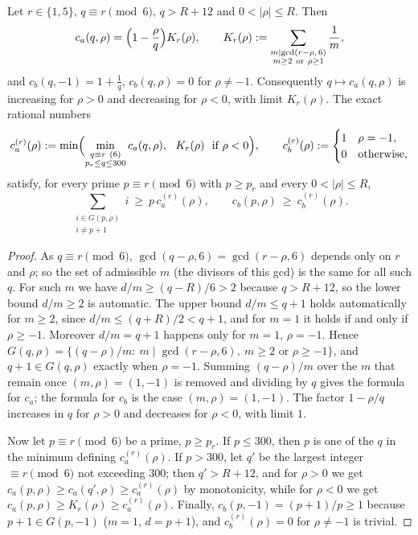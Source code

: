 \begin{lemma}\label{lem:class-weights}
Let $r\in\{1,5\}$, $q\equiv r\pmod 6$, $q>R+12$ and $0<|\rho|\le R$. Then
\[
c_a(q,\rho)=\Bigl(1-\frac\rho q\Bigr)K_r(\rho),\qquad K_r(\rho):=\sum_{\substack{m\mid\gcd(r-\rho,\,6)\\ m\ge2\ \text{or}\ \rho\ge1}}\frac1m ,
\]
and $c_b(q,-1)=1+\tfrac1q$, $c_b(q,\rho)=0$ for $\rho\ne-1$. Consequently $q\mapsto c_a(q,\rho)$ is increasing for $\rho>0$ and decreasing for $\rho<0$, with limit $K_r(\rho)$. The exact rational numbers
\[
c_a^{(r)}(\rho):=\min\Bigl(\min_{\substack{q\equiv r\ (6)\\ p_r\le q\le300}}c_a(q,\rho),\ \ K_r(\rho)\ \text{ if }\rho<0\Bigr),\qquad
c_b^{(r)}(\rho):=\begin{cases}1&\rho=-1,\\0&\text{otherwise,}\end{cases}
\]
satisfy, for every prime $p\equiv r\pmod 6$ with $p\ge p_r$ and every $0<|\rho|\le R$,
\[
\sum_{\substack{i\in G(p,\rho)\\ i\ne p+1}}i\ \ge\ p\,c_a^{(r)}(\rho),\qquad c_b(p,\rho)\ \ge\ c_b^{(r)}(\rho).
\]
\end{lemma}
\begin{proof}
As $q\equiv r\pmod6$, $\gcd(q-\rho,6)=\gcd(r-\rho,6)$ depends only on $r$ and $\rho$; so the set of admissible $m$ (the divisors of this gcd) is the same for all such $q$. For such $m$ we have $d/m\ge(q-R)/6>2$ because $q>R+12$, so the lower bound $d/m\ge2$ is automatic. The upper bound $d/m\le q+1$ holds automatically for $m\ge2$, since $d/m\le(q+R)/2<q+1$, and for $m=1$ it holds if and only if $\rho\ge-1$. Moreover $d/m=q+1$ happens only for $m=1$, $\rho=-1$. Hence $G(q,\rho)=\{(q-\rho)/m:\ m\mid\gcd(r-\rho,6),\ m\ge2\text{ or }\rho\ge-1\}$, and $q+1\in G(q,\rho)$ exactly when $\rho=-1$. Summing $(q-\rho)/m$ over the $m$ that remain once $(m,\rho)=(1,-1)$ is removed and dividing by $q$ gives the formula for $c_a$; the formula for $c_b$ is the case $(m,\rho)=(1,-1)$. The factor $1-\rho/q$ increases in $q$ for $\rho>0$ and decreases for $\rho<0$, with limit $1$.

Now let $p\equiv r\pmod 6$ be a prime, $p\ge p_r$. If $p\le300$, then $p$ is one of the $q$ in the minimum defining $c_a^{(r)}(\rho)$. If $p>300$, let $q'$ be the largest integer $\equiv r\pmod6$ not exceeding $300$; then $q'>R+12$, and for $\rho>0$ we get $c_a(p,\rho)\ge c_a(q',\rho)\ge c_a^{(r)}(\rho)$ by monotonicity, while for $\rho<0$ we get $c_a(p,\rho)\ge K_r(\rho)\ge c_a^{(r)}(\rho)$. Finally, $c_b(p,-1)=(p+1)/p\ge1$ because $p+1\in G(p,-1)$ ($m=1$, $d=p+1$), and $c_b^{(r)}(\rho)=0$ for $\rho\ne-1$ is trivial.
\end{proof}

